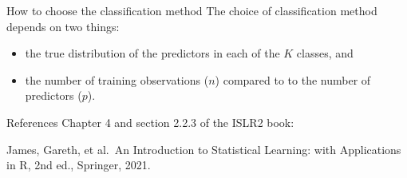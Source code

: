 \documentclass[
  ignorenonframetext,
  aspectratio=169,
]{beamer}
\begin{document}
\begin{frame}{How to choose the classification method}
\protect\hypertarget{how-to-choose-the-classification-method}{}
The choice of classification method depends on two things:

\begin{itemize}
\item
  the true distribution of the predictors in each of the \(K\) classes,
  and
\item
  the number of training observations (\(n\)) compared to to the number
  of predictors (\(p\)).
\end{itemize}
\end{frame}

\begin{frame}{References}
\protect\hypertarget{references}{}
Chapter 4 and section 2.2.3 of the ISLR2 book:

James, Gareth, et al.~An Introduction to Statistical Learning: with
Applications in R, 2nd ed., Springer, 2021.
\end{frame}
\end{document}
